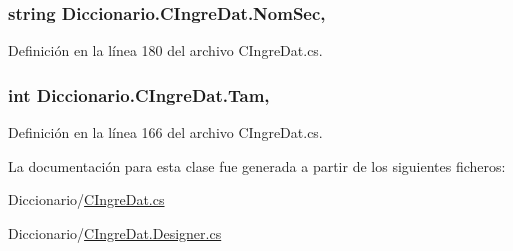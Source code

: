 \hypertarget{class_diccionario_1_1_c_ingre_dat_ab57e356c79271d9f25fe862b9afc617c}{
\subsubsection[{Nom\-Sec}]{\setlength{\rightskip}{0pt plus 5cm}string Diccionario.\-C\-Ingre\-Dat.\-Nom\-Sec\hspace{0.3cm}{\ttfamily [get]}, {\ttfamily [set]}}}\label{class_diccionario_1_1_c_ingre_dat_ab57e356c79271d9f25fe862b9afc617c}


Definición en la línea 180 del archivo C\-Ingre\-Dat.\-cs.

\hypertarget{class_diccionario_1_1_c_ingre_dat_a96cc059c90c516c7dc2d77b145c42966}{
\subsubsection[{Tam}]{\setlength{\rightskip}{0pt plus 5cm}int Diccionario.\-C\-Ingre\-Dat.\-Tam\hspace{0.3cm}{\ttfamily [get]}, {\ttfamily [set]}}}\label{class_diccionario_1_1_c_ingre_dat_a96cc059c90c516c7dc2d77b145c42966}


Definición en la línea 166 del archivo C\-Ingre\-Dat.\-cs.



La documentación para esta clase fue generada a partir de los siguientes ficheros\-:\begin{DoxyCompactItemize}
\item 
Diccionario/\hyperlink{_c_ingre_dat_8cs}{C\-Ingre\-Dat.\-cs}\item 
Diccionario/\hyperlink{_c_ingre_dat_8_designer_8cs}{C\-Ingre\-Dat.\-Designer.\-cs}\end{DoxyCompactItemize}
